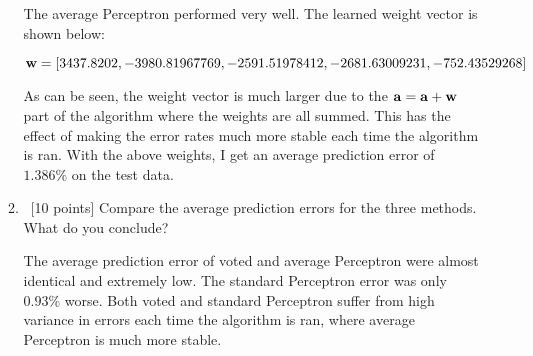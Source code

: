 \documentclass[12pt, fullpage,letterpaper]{article}
\begin{document}
\begin{enumerate}
\begin{enumerate}
	The average Perceptron performed very well. The learned weight vector is shown below:
	
	\[
		{\bf w} = [3437.8202,     -3980.81967769, -2591.51978412, -2681.63009231, -752.43529268]
	\]	
	
	As can be seen, the weight vector is much larger due to the ${\bf a} = {\bf a} + {\bf w}$ part of the algorithm where the weights are all summed. This has the effect of making the error rates much more stable each time the algorithm is ran. With the above weights, I get an average prediction error of $1.386\%$ on the test data. 
	
	\item~[10 points] Compare the average prediction errors for the three methods. What do you conclude? 

	The average prediction error of voted and average Perceptron were almost identical and extremely low. The standard Perceptron error was only $0.93\%$ worse. Both voted and standard Perceptron suffer from high variance in errors each time the algorithm is ran, where average Perceptron is much more stable. 
	
\end{enumerate}


\end{enumerate}
\end{document}
